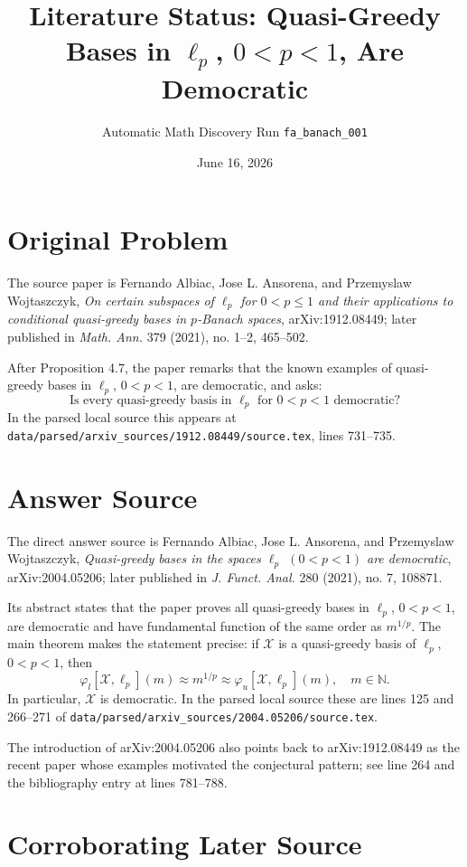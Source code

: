 \documentclass[11pt]{article}
\title{Literature Status: Quasi-Greedy Bases in \(\ell_p\), \(0<p<1\), Are Democratic}
\author{Automatic Math Discovery Run \texttt{fa\_banach\_001}}
\date{June 16, 2026}
\begin{document}
\maketitle

\section*{Original Problem}

The source paper is Fernando Albiac, Jose L. Ansorena, and Przemyslaw
Wojtaszczyk, \emph{On certain subspaces of \(\ell_p\) for \(0<p\le 1\) and
their applications to conditional quasi-greedy bases in \(p\)-Banach spaces},
arXiv:1912.08449; later published in \emph{Math. Ann.} 379 (2021),
no. 1--2, 465--502.

After Proposition 4.7, the paper remarks that the known examples of
quasi-greedy bases in \(\ell_p\), \(0<p<1\), are democratic, and asks:
\[
\text{Is every quasi-greedy basis in }\ell_p\text{ for }0<p<1\text{ democratic?}
\]
In the parsed local source this appears at
\texttt{data/parsed/arxiv\_sources/1912.08449/source.tex}, lines 731--735.

\section*{Answer Source}

The direct answer source is Fernando Albiac, Jose L. Ansorena, and
Przemyslaw Wojtaszczyk, \emph{Quasi-greedy bases in the spaces \(\ell_p\)
\((0<p<1)\) are democratic}, arXiv:2004.05206; later published in
\emph{J. Funct. Anal.} 280 (2021), no. 7, 108871.

Its abstract states that the paper proves all quasi-greedy bases in
\(\ell_p\), \(0<p<1\), are democratic and have fundamental function of the
same order as \(m^{1/p}\). The main theorem makes the statement precise:
if \(\mathcal X\) is a quasi-greedy basis of \(\ell_p\), \(0<p<1\), then
\[
\varphi_l[\mathcal X,\ell_p](m)\approx m^{1/p}\approx
\varphi_u[\mathcal X,\ell_p](m),\quad m\in\mathbb N.
\]
In particular, \(\mathcal X\) is democratic. In the parsed local source these
are lines 125 and 266--271 of
\texttt{data/parsed/arxiv\_sources/2004.05206/source.tex}.

The introduction of arXiv:2004.05206 also points back to arXiv:1912.08449 as
the recent paper whose examples motivated the conjectural pattern; see line
264 and the bibliography entry at lines 781--788.

\section*{Corroborating Later Source}
\end{document}
